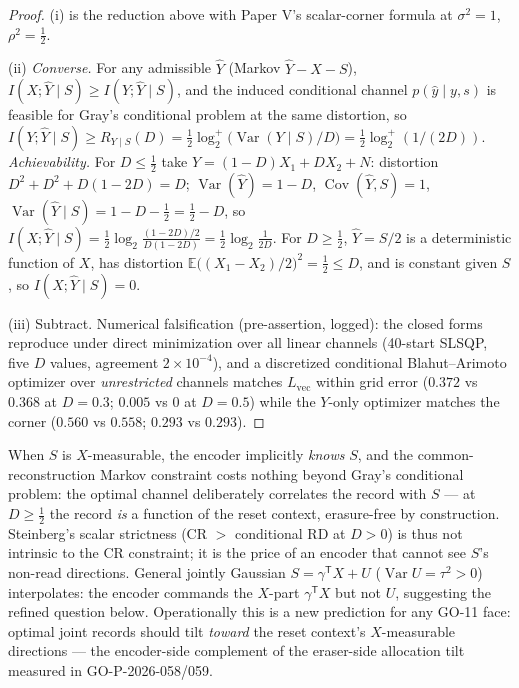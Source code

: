 \documentclass[11pt]{article}
\newcommand{\E}{\mathbb{E}}\newcommand{\tr}{\operatorname{tr}}
\newcommand{\Cov}{\operatorname{Cov}}\newcommand{\hX}{\widehat X}
\newcommand{\hY}{\widehat Y}
\begin{document}
\begin{proof}
(i) is the reduction above with Paper V's scalar-corner formula at
$\sigma^2=1$, $\rho^2=\tfrac12$.

(ii) \emph{Converse.} For any admissible $\hY$ (Markov $\hY-X-S$),
$I(X;\hY\mid S)\ge I(Y;\hY\mid S)$, and the induced conditional channel
$p(\hat y\mid y,s)$ is feasible for Gray's conditional problem at the same
distortion, so $I(Y;\hY\mid S)\ge R_{Y\mid S}(D)=\tfrac12\log_2^{+}
\bigl(\operatorname{Var}(Y\mid S)/D\bigr)=\tfrac12\log_2^{+}(1/(2D))$.
\emph{Achievability.} For $D\le\tfrac12$ take
$\hY=(1-D)X_1+DX_2+N$: distortion $D^2+D^2+D(1-2D)=D$;
$\operatorname{Var}(\hY)=1-D$, $\Cov(\hY,S)=1$,
$\operatorname{Var}(\hY\mid S)=1-D-\tfrac12=\tfrac12-D$, so
$I(X;\hY\mid S)=\tfrac12\log_2\frac{(1-2D)/2}{D(1-2D)}
=\tfrac12\log_2\frac1{2D}$. For $D\ge\tfrac12$, $\hY=S/2$ is a
deterministic function of $X$, has distortion
$\E\bigl((X_1-X_2)/2\bigr)^2=\tfrac12\le D$, and is constant given $S$, so
$I(X;\hY\mid S)=0$.

(iii) Subtract. Numerical falsification (pre-assertion, logged): the
closed forms reproduce under direct minimization over all linear channels
(40-start SLSQP, five $D$ values, agreement $2\times10^{-4}$), and a
discretized conditional Blahut--Arimoto optimizer over \emph{unrestricted}
channels matches $L_{\mathrm{vec}}$ within grid error
($0.372$ vs $0.368$ at $D=0.3$; $0.005$ vs $0$ at $D=0.5$) while the
$Y$-only optimizer matches the corner ($0.560$ vs $0.558$; $0.293$ vs
$0.293$).
\end{proof}

\begin{remark}
\label{rem:mechanism}
When $S$ is $X$-measurable, the encoder implicitly \emph{knows} $S$, and
the common-reconstruction Markov constraint costs nothing beyond Gray's
conditional problem: the optimal channel deliberately correlates the
record with $S$ --- at $D\ge\tfrac12$ the record \emph{is} a function of
the reset context, erasure-free by construction. Steinberg's scalar
strictness (CR $>$ conditional RD at $D>0$) is thus not intrinsic to the
CR constraint; it is the price of an encoder that cannot see $S$'s
non-read directions. General jointly Gaussian $S=\gamma^{\mathsf T}X+U$
($\operatorname{Var}U=\tau^2>0$) interpolates: the encoder commands the
$X$-part $\gamma^{\mathsf T}X$ but not $U$, suggesting the refined
question below. Operationally this is a new prediction for any GO-11
face: optimal joint records should tilt \emph{toward} the reset context's
$X$-measurable directions --- the encoder-side complement of the
eraser-side allocation tilt measured in GO-P-2026-058/059.
\end{remark}
\end{document}
